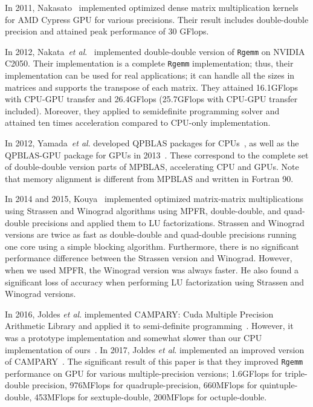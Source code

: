 \documentclass[12pt]{article}
\newcommand{\etal}{\textit{et al}.}
\begin{document}
In 2011, Nakasato~\cite{Nakasato2011AFG} implemented optimized dense matrix multiplication kernels for AMD Cypress GPU for various precisions. Their result includes double-double precision and attained peak performance of 30 GFlops.

In 2012, Nakata~\etal{}~\cite{6495966} implemented double-double version of {\tt Rgemm} on NVIDIA C2050. Their implementation is a complete {\tt Rgemm} implementation; thus, their implementation can be used for real applications; it can handle all the sizes in matrices and supports the transpose of each matrix. They attained 16.1GFlops with CPU-GPU transfer and 26.4GFlops (25.7GFlops with CPU-GPU transfer included). Moreover, they applied to semidefinite programming solver and attained ten times acceleration compared to CPU-only implementation.

In 2012, Yamada~\etal{} developed QPBLAS packages for CPUs~\cite{7965202}, as well as the QPBLAS-GPU package for GPUs in 2013~\cite{qpblas-gpu}. These correspond to the complete set of double-double version parts of MPBLAS, accelerating CPU and GPUs. Note that memory alignment is different from MPBLAS and written in Fortran 90.

In 2014 and 2015, Kouya~\cite{Tomonori_Kouya2014,Tomonori_Kouya2016} implemented optimized  matrix-matrix multiplications using Strassen and Winograd algorithms using MPFR, double-double, and quad-double precisions and applied them to LU factorizations. Strassen and Winograd versions are twice as fast as double-double and quad-double precisions running one core using a simple blocking algorithm. Furthermore, there is no significant performance difference between the Strassen version and Winograd. However, when we used MPFR, the Winograd version was always faster. He also found a significant loss of accuracy when performing LU factorization using Strassen and Winograd versions.

In 2016, Joldes \etal{} implemented CAMPARY: Cuda Multiple Precision Arithmetic Library and applied it to semi-definite programming~\cite{10.1007/978-3-319-42432-3_29}. However, it was a prototype implementation and somewhat slower than our CPU implementation of ours~\cite{SDPA-GMP}. In 2017, Joldes \etal{} implemented an improved version of CAMPARY~\cite{8023060}. The significant result of this paper is that they improved {\tt Rgemm} performance on GPU for various multiple-precision versions; 1.6GFlops for triple-double precision, 976MFlops for quadruple-precision, 660MFlops for quintuple-double, 453MFlops for sextuple-double, 200MFlops for octuple-double.
\end{document}
